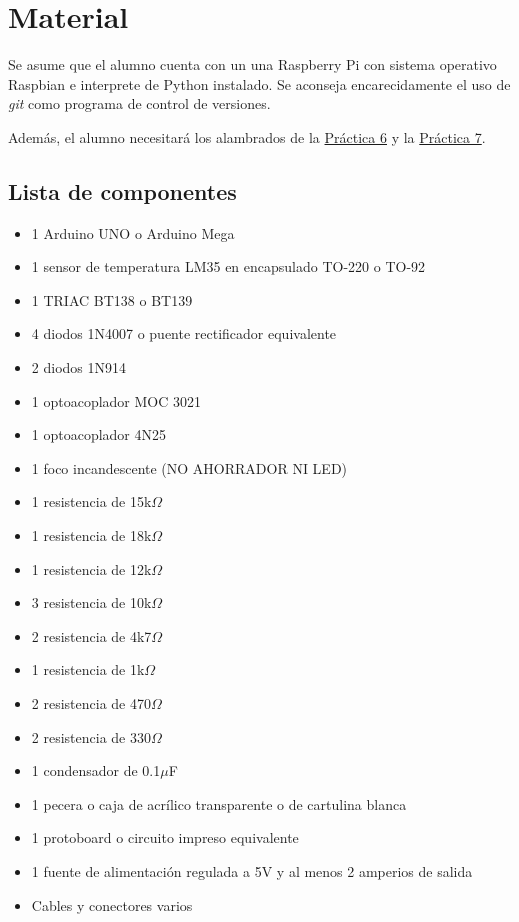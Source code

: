 
%
%
\section{Material}%
\label{sec:material}
Se asume que el alumno cuenta con un una Raspberry Pi con sistema operativo Raspbian e interprete de Python instalado. Se aconseja encarecidamente el uso de \textit{git} como programa de control de versiones.

Además, el alumno necesitará los alambrados de la
\href{https://github.com/kyordhel/FSEm/tree/master/practica06}{Práctica 6}
y la
\href{https://github.com/kyordhel/FSEm/tree/master/practica07}{Práctica 7}.

\subsection{Lista de componentes}%
\label{sec:material-component-list}

\begin{itemize}[noitemsep]
	\item 1 Arduino UNO o Arduino Mega
	\item 1 sensor de temperatura LM35 en encapsulado TO-220 o TO-92
	\item 1 TRIAC BT138 o BT139
	\item 4 diodos 1N4007 o puente rectificador equivalente
	\item 2 diodos 1N914
	\item 1 optoacoplador MOC 3021
	\item 1 optoacoplador 4N25
	\item 1 foco incandescente (NO AHORRADOR NI LED)
	\item 1 resistencia de 15k$\Omega$
	\item 1 resistencia de 18k$\Omega$
	\item 1 resistencia de 12k$\Omega$\footnotemark
	\item 3 resistencia de 10k$\Omega$
	\item 2 resistencia de 4k7$\Omega$
	\item 1 resistencia de  1k$\Omega$
	\item 2 resistencia de 470$\Omega$
	\item 2 resistencia de 330$\Omega$
	\item 1 condensador de 0.1$\mu$F
	\item 1 pecera o caja de acrílico transparente o de cartulina blanca
	\item 1 protoboard o circuito impreso equivalente
	\item 1 fuente de alimentación regulada a 5V y al menos 2 amperios de salida
	\item Cables y conectores varios
\end{itemize}


